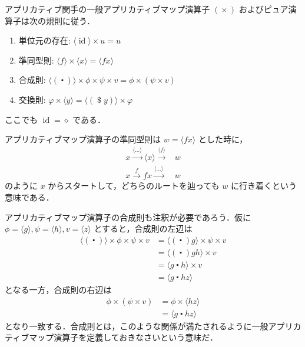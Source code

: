 \documentclass[a4paper,twocolumn]{jsbook}
\newcommand{\mAnonParam}{\diamond}
\DeclareMathOperator{\mId}{id}
\DeclareMathOperator{\mApply}{\$}
\DeclareMathOperator{\mAppMap}{\times}
\DeclareMathOperator{\mComp}{\centerdot}
\DeclareMathOperator{\mMap}{\bullet}
\newcommand{\mPureWith}[1]{\langle#1\rangle}
\begin{document}
アプリカティブ関手の一般アプリカティブマップ演算子 $(\mAppMap)$ およびピュア演算子は次の規則に従う．
\begin{enumerate}
\item 単位元の存在: $\mPureWith{\mId}\mAppMap u=u$
\item 準同型則: $\mPureWith{f}\mAppMap\mPureWith{x}=\mPureWith{fx}$
\item 合成則: $\mPureWith{(\mComp)}\mAppMap\phi\mAppMap\psi\mAppMap v=\phi\mAppMap{}(\psi\mAppMap v)$
\item 交換則: $\varphi\mAppMap\mPureWith{y}=\mPureWith{(\mApply y)}\mAppMap\varphi$
\end{enumerate}
ここでも $\mId=\mAnonParam$ である．

アプリカティブマップ演算子の準同型則は $w=\mPureWith{fx}$ とした時に，
\begin{align}
x\xrightarrow{\mPureWith{\dots}}\mPureWith{x}\xrightarrow{\mPureWith{f}}&w\\
x\xrightarrow{f}fx\xrightarrow{\mPureWith{\dots}}&w
\end{align}
のように $x$ からスタートして，どちらのルートを辿っても $w$ に行き着くという意味である．

アプリカティブマップ演算子の合成則も注釈が必要であろう．仮に $\phi=\mPureWith{g},\psi=\mPureWith{h},v=\mPureWith{z}$ とすると，合成則の左辺は
\begin{align}
\mPureWith{(\mComp)}\mAppMap\phi\mAppMap\psi\mAppMap v
&=\mPureWith{(\mComp)g}\mAppMap\psi\mAppMap v\\
&=\mPureWith{(\mComp)gh}\mAppMap v\\
&=\mPureWith{g\mComp h}\mAppMap v\\
&=\mPureWith{g\mComp hz}
\end{align}
となる一方，合成則の右辺は
\begin{align}
\phi\mAppMap{}(\psi\mAppMap v)
&=\phi\mAppMap\mPureWith{hz}\\
&=\mPureWith{g\mComp hz}
\end{align}
となり一致する．合成則とは，このような関係が満たされるように一般アプリカティブマップ演算子を定義しておきなさいという意味だ．
\end{document}
